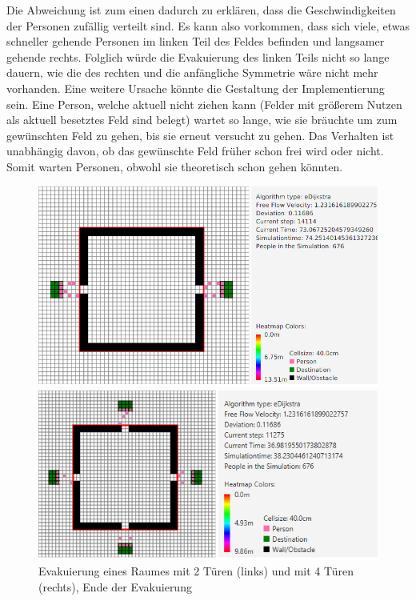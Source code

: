 Die Abweichung ist zum einen dadurch zu erklären, dass die Geschwindigkeiten der Personen zufällig verteilt sind. Es kann also vorkommen, dass sich viele, etwas schneller gehende Personen im linken Teil des Feldes befinden und langsamer gehende rechts. Folglich würde die Evakuierung des linken Teils nicht so lange dauern, wie die des rechten und die anfängliche Symmetrie wäre nicht mehr vorhanden. Eine weitere Ursache könnte die Gestaltung der Implementierung sein. Eine Person, welche aktuell nicht ziehen kann (Felder mit größerem Nutzen als aktuell besetztes Feld sind belegt) wartet so lange, wie sie bräuchte um zum gewünschten Feld zu gehen, bis sie erneut versucht zu gehen. Das Verhalten ist unabhängig davon, ob das gewünschte Feld früher schon frei wird oder nicht. Somit warten Personen, obwohl sie theoretisch schon gehen könnten. 

\begin{figure}[!htb]
	\centering
	\begin{minipage}{.5\textwidth}
		\centering
		\includegraphics[width=\textwidth]{abbildungen/Evak2TuerenEnde.PNG}
	\end{minipage}%
	\begin{minipage}{0.5\textwidth}
		\centering
		\includegraphics[width=\textwidth]{abbildungen/Evak4TuerenEnde.PNG}
	\end{minipage}
			\caption{Evakuierung eines Raumes mit 2 Türen (links) und mit 4 Türen (rechts), Ende der Evakuierung}
			\label{fig:Eva2T4TEnde}
\end{figure}


